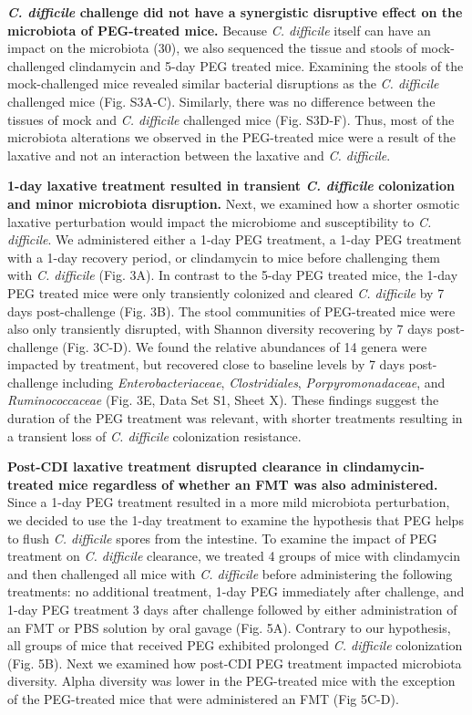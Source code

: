 \documentclass[
  11pt,
]{article}
\begin{document}
\textbf{\emph{C. difficile} challenge did not have a synergistic
disruptive effect on the microbiota of PEG-treated mice.} Because
\emph{C. difficile} itself can have an impact on the microbiota (30), we
also sequenced the tissue and stools of mock-challenged clindamycin and
5-day PEG treated mice. Examining the stools of the mock-challenged mice
revealed similar bacterial disruptions as the \emph{C. difficile}
challenged mice (Fig. S3A-C). Similarly, there was no difference between
the tissues of mock and \emph{C. difficile} challenged mice (Fig.
S3D-F). Thus, most of the microbiota alterations we observed in the
PEG-treated mice were a result of the laxative and not an interaction
between the laxative and \emph{C. difficile}.

\textbf{1-day laxative treatment resulted in transient \emph{C.
difficile} colonization and minor microbiota disruption.} Next, we
examined how a shorter osmotic laxative perturbation would impact the
microbiome and susceptibility to \emph{C. difficile}. We administered
either a 1-day PEG treatment, a 1-day PEG treatment with a 1-day
recovery period, or clindamycin to mice before challenging them with
\emph{C. difficile} (Fig. 3A). In contrast to the 5-day PEG treated
mice, the 1-day PEG treated mice were only transiently colonized and
cleared \emph{C. difficile} by 7 days post-challenge (Fig. 3B). The
stool communities of PEG-treated mice were also only transiently
disrupted, with Shannon diversity recovering by 7 days post-challenge
(Fig. 3C-D). We found the relative abundances of 14 genera were impacted
by treatment, but recovered close to baseline levels by 7 days
post-challenge including \emph{Enterobacteriaceae},
\emph{Clostridiales}, \emph{Porpyromonadaceae}, and
\emph{Ruminococcaceae} (Fig. 3E, Data Set S1, Sheet X). These findings
suggest the duration of the PEG treatment was relevant, with shorter
treatments resulting in a transient loss of \emph{C. difficile}
colonization resistance.

\textbf{Post-CDI laxative treatment disrupted clearance in
clindamycin-treated mice regardless of whether an FMT was also
administered.} Since a 1-day PEG treatment resulted in a more mild
microbiota perturbation, we decided to use the 1-day treatment to
examine the hypothesis that PEG helps to flush \emph{C. difficile}
spores from the intestine. To examine the impact of PEG treatment on
\emph{C. difficile} clearance, we treated 4 groups of mice with
clindamycin and then challenged all mice with \emph{C. difficile} before
administering the following treatments: no additional treatment, 1-day
PEG immediately after challenge, and 1-day PEG treatment 3 days after
challenge followed by either administration of an FMT or PBS solution by
oral gavage (Fig. 5A). Contrary to our hypothesis, all groups of mice
that received PEG exhibited prolonged \emph{C. difficile} colonization
(Fig. 5B). Next we examined how post-CDI PEG treatment impacted
microbiota diversity. Alpha diversity was lower in the PEG-treated mice
with the exception of the PEG-treated mice that were administered an FMT
(Fig 5C-D).
\end{document}
